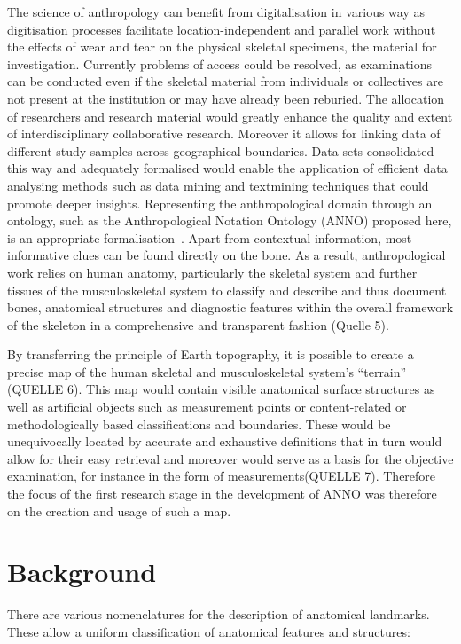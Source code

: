 \documentclass[sw]{iosart2x}
\begin{document}
The science of anthropology can benefit from digitalisation in various way as digitisation processes facilitate location-independent and parallel work without the effects of wear and tear on the physical skeletal specimens, the material for investigation.
Currently problems of access could be resolved, as examinations can be conducted even if the skeletal material from individuals or collectives are not present at the institution or may have already been reburied.
The allocation of researchers and research material would greatly enhance the quality and extent of interdisciplinary collaborative research.
Moreover it allows for linking data of different study samples across geographical boundaries.
Data sets consolidated this way and adequately formalised would enable the application of efficient data analysing methods such as data mining and textmining techniques that could promote deeper insights.
Representing the anthropological domain through an ontology, such as the Anthropological Notation Ontology (ANNO) proposed here, is an appropriate formalisation~\citep{aw3dunpublished}.
Apart from contextual information, most informative clues can be found directly on the bone.
As a result, anthropological work relies on human anatomy, particularly the skeletal system and further tissues of the musculoskeletal system to classify and describe and thus document bones, anatomical structures and diagnostic features within the overall framework of the skeleton in a comprehensive and transparent fashion (Quelle 5).

By transferring the principle of Earth topography, it is possible to create a precise map of the human skeletal and musculoskeletal system's \enquote{terrain} (QUELLE 6).
This map would contain visible anatomical surface structures as well as artificial objects such as measurement points or content-related or methodologically based classifications and boundaries.
These would be unequivocally located by accurate and exhaustive definitions that in turn would allow for their easy retrieval and moreover would serve as a basis for the objective examination, for instance in the form of measurements(QUELLE 7).
Therefore the focus of the first research stage in the development of ANNO was therefore on the creation and usage of such a map.

\section{Background}
There are various nomenclatures for the description of anatomical landmarks.
These allow a uniform classification of anatomical features and structures:
\end{document}
